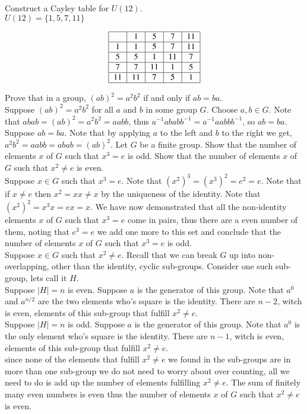 \documentclass[12pt]{article}
\makeatletter
\theoremstyle{homework}
\newenvironment{exercise}[1]
{\def\@currentlabel{#1}\exercisecore}
{\endexercisecore}
\makeatother
\begin{document}
\begin{exercise}
{2.32}
Construct a Cayley table for $U(12)$.\\
$U(12)=\{1,5,7,11\}$

$$\begin{tabular}{|c|c|c|c|c|}
\hline
& 1 & 5 & 7 & 11\\
\hline
1 & 1 & 5 & 7 & 11\\
\hline
5 & 5 & 1 & 11 & 7 \\
\hline
7 & 7 &11 &1 &5 \\
\hline
11 & 11 &7 &5 &1 \\
\hline
\end{tabular}
$$

\end{exercise}

\begin{exercise}
{2.34}
Prove that in a group, $(ab) ^2 = a ^2 b ^2$ if and only if $ab = ba$.\\
Suppose $(ab) ^2 = a ^2 b ^2$ for all $a$ and $b$ in some group $G$.  Choose $a,b\in G$.  Note that $abab=(ab) ^2 = a ^2 b ^2=aabb$, thus $a^{-1}ababb^{-1}=a^{-1}aabb b^{-1}$, so $ab=ba$.\\
Suppose $ab = ba$.  Note that by applying $a$ to the left and $b$ to the right we get, $a^2b^2=aabb=abab=(ab)^2$.
\end{exercise}
\begin{exercise}
{2.37}
Let $G$ be a finite group. Show that the number of elements $x$ of $G$ such that $x^3 = e$ is odd. Show that the number of elements $x$ of $G$ such that $x^2 \neq e$ is even.\\
Suppose $x\in G$ such that $x^3=e$.  Note that $(x^2)^3=(x^3)^2=e^2=e$.  Note that if $x\neq e$ then $x^2=xx\neq x$ by the uniqueness of the identity.  Note that $(x^2)^2=x^3x=ex=x$.  We have now demonstrated that all the non-identity elements $x$ of $G$ such that $x^3 =e$ come in pairs, thus there are a even number of them, noting that $e^3=e$ we add one more to this set and conclude that the number of elements $x$ of $G$ such that $x^3 =e$ is odd.\\
Suppose $x\in G$ such that $x^2 \neq e$.  Recall that we can break $G$ up into non-overlapping, other than the identity, cyclic sub-groups.  Consider one such sub-group, lets call it $H$.\\
Suppose $|H|=n$ is even.  Suppose $a$ is the generator of this group.  Note that $a^0$ and $a^{n/2}$ are the two elements who's square is the identity.  There are $n-2$, witch is even, elements of this sub-group that fulfill $x^2\neq e$.\\
Suppose $|H|=n$ is odd.  Suppose $a$ is the generator of this group.  Note that $a^0$ is the only element who's square is the identity.  There are $n-1$, witch is even, elements of this sub-group that fulfill $x^2\neq e$.\\
since none of the elements that fulfill $x^2\neq e$ we found in the sub-groups are in more than one sub-group we do not need to worry about over counting, all we need to do is add up the number of elements fulfilling $x^2\neq e$.  The sum of finitely many even numbers is even thus the number of elements $x$ of $G$ such that $x^2 \neq e$ is even.
\end{exercise}
\end{document}
